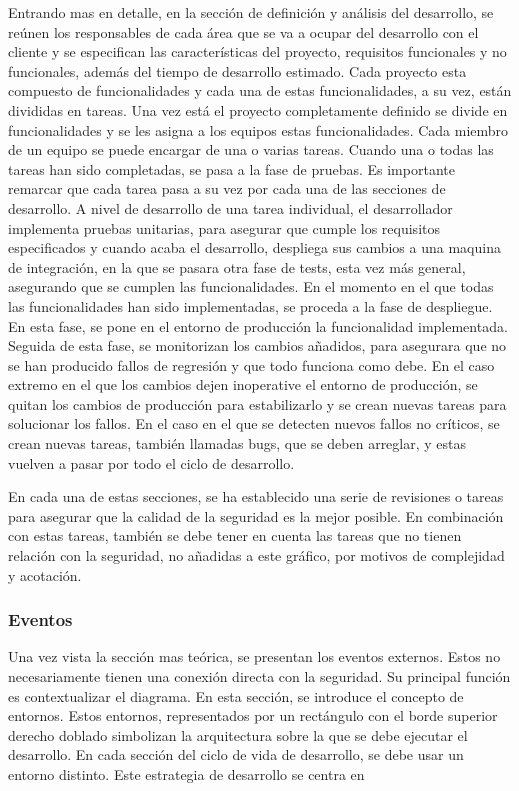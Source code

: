 \documentclass[12pt]{report} %
\begin{document}
Entrando mas en detalle, en la sección de definición y análisis del desarrollo,
se reúnen los responsables de cada área que se va a ocupar del desarrollo con el
cliente y se especifican las características del proyecto, requisitos
funcionales y no funcionales, además del tiempo de desarrollo estimado.  Cada
proyecto esta compuesto de funcionalidades y cada una de estas funcionalidades,
a su vez, están divididas en tareas.  Una vez está el proyecto completamente
definido se divide en funcionalidades y se les asigna a los equipos estas
funcionalidades.  Cada miembro de un equipo se puede encargar de una o varias
tareas.  Cuando una o todas las tareas han sido completadas, se pasa a la fase
de pruebas.  Es importante remarcar que cada tarea pasa a su vez por cada una de
las secciones de desarrollo.  A nivel de desarrollo de una tarea individual, el
desarrollador implementa pruebas unitarias, para asegurar que cumple los
requisitos especificados y cuando acaba el desarrollo, despliega sus cambios a
una maquina de integración, en la que se pasara otra fase de tests, esta vez más
general, asegurando que se cumplen las funcionalidades.  En el momento en el que
todas las funcionalidades han sido implementadas, se proceda a la fase de
despliegue.  En esta fase, se pone en el entorno de producción la funcionalidad
implementada.  Seguida de esta fase, se monitorizan los cambios añadidos, para
asegurara que no se han producido fallos de regresión y que todo funciona como
debe.  En el caso extremo en el que los cambios dejen inoperative el entorno de
producción, se quitan los cambios de producción para estabilizarlo y se crean
nuevas tareas para solucionar los fallos.  En el caso en el que se detecten
nuevos fallos no críticos, se crean nuevas tareas, también llamadas bugs, que se
deben arreglar, y estas vuelven a pasar por todo el ciclo de desarrollo.

En cada una de estas secciones, se ha establecido una serie de revisiones o
tareas para asegurar que la calidad de la seguridad es la mejor posible.  En
combinación con estas tareas, también se debe tener en cuenta las tareas que no
tienen relación con la seguridad, no añadidas a este gráfico, por motivos de
complejidad y acotación.

\subsubsection{Eventos}

Una vez vista la sección mas teórica, se presentan los eventos externos.  Estos
no necesariamente tienen una conexión directa con la seguridad.  Su principal
función es contextualizar el diagrama.  En esta sección, se introduce el
concepto de entornos.  Estos entornos, representados por un rectángulo con el
borde superior derecho doblado simbolizan la arquitectura sobre la que se debe
ejecutar el desarrollo.  En cada sección del ciclo de vida de desarrollo, se
debe usar un entorno distinto. Este estrategia de desarrollo se centra en 
\end{document}

